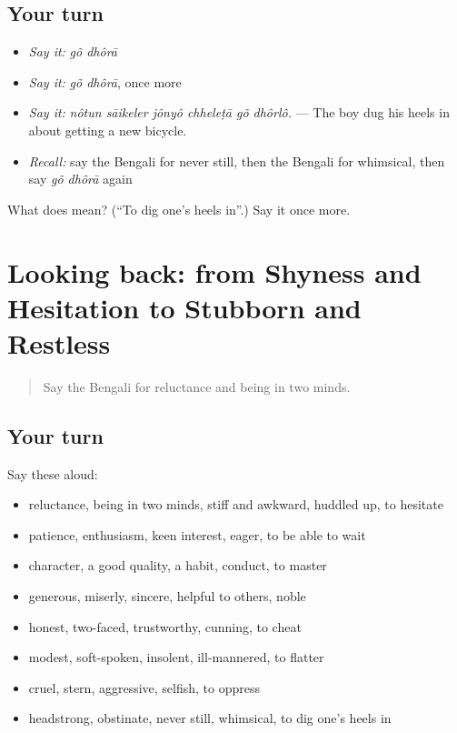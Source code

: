 \subsection*{Your turn}
\begin{itemize}
\raggedright
  \item \emph{Say it:} \emph{gõ dhôrā}
  \item \emph{Say it:} \emph{gõ dhôrā}, once more
  \item \emph{Say it:} \emph{nôtun sāikeler jônyô chheleṭā gõ dhôrlô.} — The boy dug his heels in about getting a new bicycle.
  \item \emph{Recall:} say the Bengali for never still, then the Bengali for whimsical, then say \emph{gõ dhôrā} again
\end{itemize}

\begin{tcolorbox}[breakable,colback=teal!4,colframe=teal!35!black,title={Before you move on}]
What does   mean? (\textquotedblleft{}To dig one's heels in\textquotedblright{}.) Say it once more.
\end{tcolorbox}
\section[(dialogue)]{Looking back: from Shyness and Hesitation to Stubborn and Restless}

\label{lesson:BN-R461-review-454-461}



\begin{quote}
Say the Bengali for reluctance and being in two minds.
\end{quote}

\subsection*{Your turn}
Say these aloud:

\begin{itemize}
\raggedright
  \item reluctance, being in two minds, stiff and awkward, huddled up, to hesitate
  \item patience, enthusiasm, keen interest, eager, to be able to wait
  \item character, a good quality, a habit, conduct, to master
  \item generous, miserly, sincere, helpful to others, noble
  \item honest, two-faced, trustworthy, cunning, to cheat
  \item modest, soft-spoken, insolent, ill-mannered, to flatter
  \item cruel, stern, aggressive, selfish, to oppress
  \item headstrong, obstinate, never still, whimsical, to dig one's heels in
\end{itemize}

